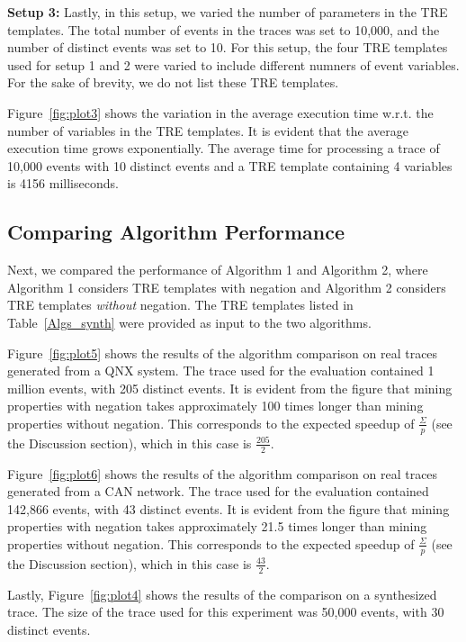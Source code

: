 \documentclass[]{sigplanconf}
\begin{document}
\noindent \textbf{Setup 3:}
Lastly, in this setup, we varied the number of parameters in the TRE templates. The total number of events in the traces was set to 10,000, and the number of distinct events was set to 10. For this setup, the four TRE templates used for setup 1 and 2 were varied to include different numners of event variables. For the sake of brevity, we do not list these TRE templates.

Figure~\ref{fig:plot3} shows the variation in the average execution time w.r.t. the number of variables in the TRE templates.
It is evident that the average execution time grows exponentially. The average time for processing a trace of 10,000 events with 10 distinct events and a TRE template containing 4 variables is 4156 milliseconds.


\subsection{Comparing Algorithm Performance}

Next, we compared the performance of Algorithm 1 and Algorithm 2, where Algorithm 1 considers TRE templates with negation and Algorithm 2 considers TRE templates \emph{without} negation. The TRE templates listed in Table~\ref{Algs_synth} were provided as input to the two algorithms.

Figure~\ref{fig:plot5} shows the results of the algorithm comparison on real traces generated from a QNX system. The trace used for the evaluation contained 1 million events, with 205 distinct events. It is evident from the figure that mining properties with negation takes approximately 100 times longer than mining properties without negation. This corresponds to the expected speedup of $\frac{\Sigma}{p}$ (see the Discussion section), which in this case is $\frac{205}{2}$.

Figure~\ref{fig:plot6} shows the results of the algorithm comparison on real traces generated from a CAN network. The trace used for the evaluation contained 142,866 events, with 43 distinct events. It is evident from the figure that mining properties with negation takes approximately 21.5 times longer than mining properties without negation. This corresponds to the expected speedup of $\frac{\Sigma}{p}$ (see the Discussion section), which in this case is $\frac{43}{2}$.

Lastly, Figure~\ref{fig:plot4} shows the results of the comparison on a synthesized trace. The size of the trace used for this experiment was 50,000 events, with 30 distinct events.
\end{document}
